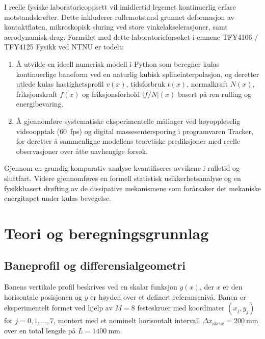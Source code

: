 \documentclass[11pt,a4paper]{article}
\begin{document}
I reelle fysiske laboratorieoppsett vil imidlertid legemet kontinuerlig erfare motstandskrefter. Dette inkluderer rullemotstand grunnet deformasjon av kontaktflaten, mikroskopisk sluring ved store vinkelakselerasjoner, samt aerodynamisk drag. Formålet med dette laboratorieforsøket i emnene TFY4106 / TFY4125 Fysikk ved NTNU er todelt:
\begin{enumerate}
    \item Å utvikle en ideell numerisk modell i Python som beregner kulas kontinuerlige baneform ved en naturlig kubisk splineinterpolasjon, og deretter utlede kulas hastighetsprofil $v(x)$, tidsforbruk $t(x)$, normalkraft $N(x)$, friksjonskraft $f(x)$ og friksjonsforhold $|f/N|(x)$ basert på ren rulling og energibevaring.
    \item Å gjennomføre systematiske eksperimentelle målinger ved høyoppløselig videoopptak (\SI{60}{fps}) og digital massesentersporing i programvaren Tracker, for deretter å sammenligne modellens teoretiske prediksjoner med reelle observasjoner over åtte uavhengige forsøk.
\end{enumerate}
Gjennom en grundig komparativ analyse kvantifiseres avvikene i rulletid og sluttfart. Videre gjennomføres en formell statistisk usikkerhetsanalyse og en fysikkbasert drøfting av de dissipative mekanismene som forårsaker det mekaniske energitapet under kulas bevegelse.

\section{Teori og beregningsgrunnlag}

\subsection{Baneprofil og differensialgeometri}
Banens vertikale profil beskrives ved en skalar funksjon $y(x)$, der $x$ er den horisontale posisjonen og $y$ er høyden over et definert referansenivå. Banen er eksperimentelt formet ved hjelp av $M = 8$ festeskruer med koordinater $(x_j, y_j)$ for $j = 0, 1, \dots, 7$, montert med et nominelt horisontalt intervall $\Delta x_{\text{skrue}} = \SI{200}{\milli\meter}$ over en total lengde på $L = \SI{1400}{\milli\meter}$.
\end{document}
